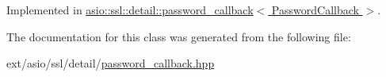 Implemented in \hyperlink{classasio_1_1ssl_1_1detail_1_1password__callback_ae832e50c50f08d00646b22e744006276}{asio\+::ssl\+::detail\+::password\+\_\+callback$<$ Password\+Callback $>$}.



The documentation for this class was generated from the following file\+:\begin{DoxyCompactItemize}
\item 
ext/asio/ssl/detail/\hyperlink{password__callback_8hpp}{password\+\_\+callback.\+hpp}\end{DoxyCompactItemize}
